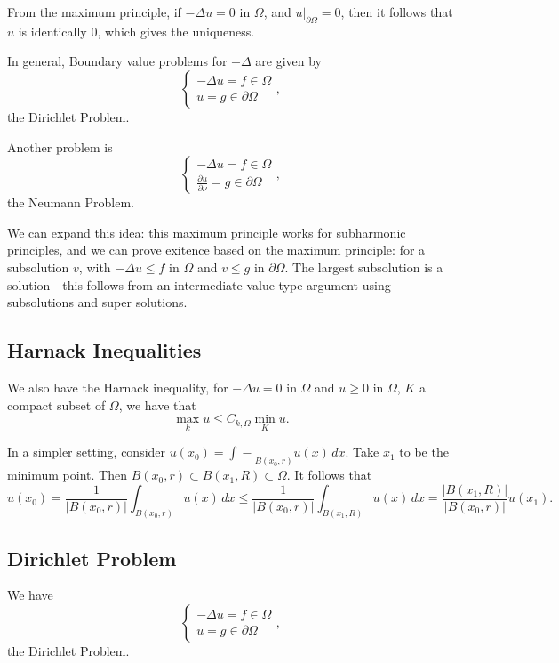 \documentclass[12pt]{scrartcl}
\newcommand{\aint}{\mathrel{\int\!\!\!\!\!\!-}}
\begin{document}
From the maximum principle, if $-\Delta u = 0$ in $\Omega$, and $u\vert_{\partial \Omega} = 0$, then it follows that $u$ is identically $0$, which gives the uniqueness.

In general, Boundary value problems for $-\Delta$ are given by 
$$\begin{cases}
-\Delta u = f \in \Omega \\
u = g \in \partial \Omega
\end{cases},$$
the Dirichlet Problem.

Another problem is 
$$\begin{cases}
-\Delta u = f \in \Omega \\
\frac{\partial u}{\partial \nu} = g \in \partial \Omega
\end{cases},$$
the Neumann Problem.

We can expand this idea: this maximum principle works for subharmonic principles, and we can prove exitence based on the maximum principle: for a subsolution $v$, with $-\Delta u \le f$ in $\Omega$ and $v \le g$ in $\partial \Omega$.  The largest subsolution is a solution - this follows from an intermediate value type argument using subsolutions and super solutions.

\subsection{Harnack Inequalities}
We also have the Harnack inequality, for $-\Delta u = 0$ in $\Omega$ and $u \ge 0$ in $\Omega$, $K$ a compact subset of $\Omega$, we have that 
$$\max_k u \le C_{k, \Omega} \min_K u.$$

In a simpler setting, consider $u(x_0) = \aint_{B(x_0, r)} u(x)\,dx$.  Take $x_1$ to be the minimum point.  Then $B(x_0, r) \subset B(x_1, R) \subset \Omega$.  It follows that 
$$u(x_0) = \frac{1}{|B(x_0, r)|}\int_{B(x_0, r)} u(x)\, dx \le \frac{1}{ |B(x_0, r)|}\int_{B(x_1, R)} u(x)\,dx = \frac{|B(x_1, R)|}{|B(x_0, r)|}u(x_1).$$

\subsection{Dirichlet Problem}
We have 
$$\begin{cases}
-\Delta u = f \in \Omega \\
u = g \in \partial \Omega
\end{cases},$$
the Dirichlet Problem.
\end{document}
